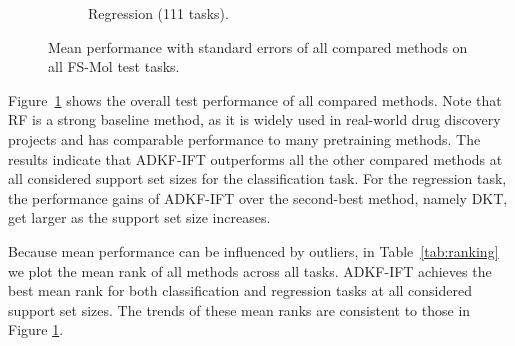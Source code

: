 \begin{figure}
\begin{subfigure}{.45\textwidth}
                \caption{Regression (111 tasks).}
            \end{subfigure}
        \caption{Mean performance with standard errors of all compared methods on all FS-Mol test tasks.}
        \label{fig:aggregated-perforamnce}
        \end{figure}
        Figure~\ref{fig:aggregated-perforamnce} shows the overall test performance of all compared methods.
        Note that RF is 
        a strong baseline method, as it is widely used in real-world drug discovery projects
        and has comparable performance to 
        many %
        pretraining methods.
        The results indicate that ADKF-IFT outperforms all the other compared methods at all
        considered support set sizes for the classification task.
        For the regression task, the performance gains of ADKF-IFT over the second-best method,
        namely DKT, get larger as the support set size increases.

        Because mean performance can be influenced by outliers, in
        Table~\ref{tab:ranking} we plot the mean rank of all methods across all tasks.
        ADKF-IFT achieves the best mean rank for both classification and regression tasks
        at all considered support set sizes. The trends of these mean ranks are consistent to
        those in Figure \ref{fig:aggregated-perforamnce}.

